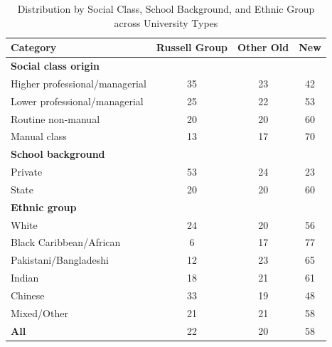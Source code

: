 \begin{table}[h!]
\centering
\caption{Distribution by Social Class, School Background, and Ethnic Group across University Types}
\label{tab:university_distribution}
\begin{tabular}{lccc}
\hline
\textbf{Category}                   & \textbf{Russell Group} & \textbf{Other Old} & \textbf{New} \\ \hline
\textbf{Social class origin}        &                       &                   &              \\
Higher professional/managerial      & 35                    & 23                & 42           \\
Lower professional/managerial       & 25                    & 22                & 53           \\
Routine non-manual                  & 20                    & 20                & 60           \\
Manual class                        & 13                    & 17                & 70           \\
\textbf{School background}          &                       &                   &              \\
Private                             & 53                    & 24                & 23           \\
State                               & 20                    & 20                & 60           \\
\textbf{Ethnic group}               &                       &                   &              \\
White                               & 24                    & 20                & 56           \\
Black Caribbean/African             & 6                     & 17                & 77           \\
Pakistani/Bangladeshi               & 12                    & 23                & 65           \\
Indian                              & 18                    & 21                & 61           \\
Chinese                             & 33                    & 19                & 48           \\
Mixed/Other                         & 21                    & 21                & 58           \\
\textbf{All}                        & 22                    & 20                & 58           \\ \hline
\end{tabular}
\end{table}
